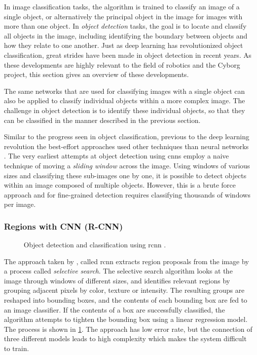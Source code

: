 \documentclass[\rootfolder/main.tex]{subfiles}
\begin{document}
In image classification tasks, the algorithm is trained to classify an image of a single object, or alternatively the principal object in the image for images with more than one object.
In \emph{object detection} tasks, the goal is to locate and classify all objects in the image, including identifying the boundary between objects and how they relate to one another.
Just as deep learning has revolutionized object classification, great strides have been made in object detection in recent years.
As these developments are highly relevant to the field of robotics and the Cyborg project, this section gives an overview of these developments.

The same networks that are used for classifying images with a single object can also be applied to classify individual objects within a more complex image.
The challenge in object detection is to identify these individual objects, so that they can be classified in the manner described in the previous section.

Similar to the progress seen in object classification, previous to the deep learning revolution the best-effort approaches used other techniques than neural networks \cite{Girshick2013}.
The very earliest attempts at object detection using \acrshort{cnn}s employ a naive technique of moving a \emph{sliding window} across the image.
Using windows of various sizes and classifying these sub-images one by one, it is possible to detect objects within an image composed of multiple objects.
However, this is a brute force approach and for fine-grained detection requires classifying thousands of windows per image.

\subsubsection{Regions with CNN (R-CNN)}

\begin{figure}
    \caption[Object detection and classification using \acrshort{rcnn}]{Object detection and classification using \acrshort{rcnn} \cite{Girshick2013}.\label{fig:r-cnn}}
\end{figure}

The approach taken by \cite{Girshick2013}, called \acrfull{rcnn} extracts region proposals from the image by a process called \emph{selective search}.
The selective search algorithm looks at the image through windows of different sizes, and identifies relevant regions by grouping adjacent pixels by color, texture or intensity.
The resulting groups are reshaped into bounding boxes, and the contents of each bounding box are fed to an image classifier.
If the contents of a box are successfully classified, the algorithm attempts to tighten the bounding box using a linear regression model.
The process is shown in \cref{fig:r-cnn}.
The approach has low error rate, but the connection of three different models leads to high complexity which makes the system difficult to train.
\end{document}
